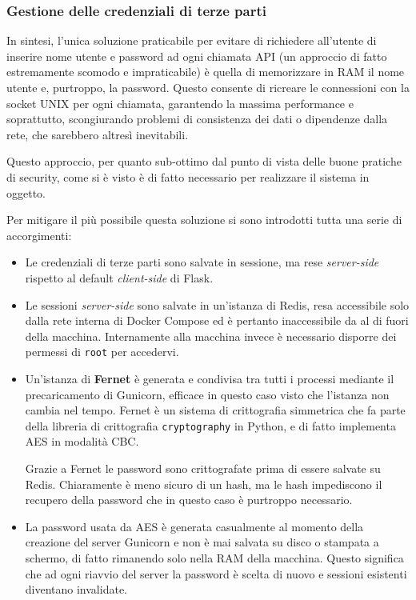 \subsubsection{Gestione delle credenziali di terze parti}
In sintesi, l'unica soluzione praticabile per evitare di richiedere all'utente di inserire nome utente e password ad ogni chiamata API (un approccio di fatto estremamente scomodo e impraticabile) è quella di memorizzare in RAM il nome utente e, purtroppo, la password. Questo consente di ricreare le connessioni con la socket UNIX per ogni chiamata, garantendo la massima performance e soprattutto, scongiurando problemi di consistenza dei dati o dipendenze dalla rete, che sarebbero altresì inevitabili.

Questo approccio, per quanto sub-ottimo dal punto di vista delle buone pratiche di security, come si è visto è di fatto necessario per realizzare il sistema in oggetto.

Per mitigare il più possibile questa soluzione si sono introdotti tutta una serie di accorgimenti:
\begin{itemize}
    \item Le credenziali di terze parti sono salvate in sessione, ma rese \emph{server-side} rispetto al default \emph{client-side} di Flask.
    \item Le sessioni \emph{server-side} sono salvate in un'istanza di Redis, resa accessibile solo dalla rete interna di Docker Compose ed è pertanto inaccessibile da al di fuori della macchina. Internamente alla macchina invece è necessario disporre dei permessi di \texttt{root} per accedervi.
    \item Un'istanza di \textbf{Fernet} è generata e condivisa tra tutti i processi mediante il precaricamento di Gunicorn, efficace in questo caso visto che l'istanza non cambia nel tempo. Fernet è un sistema di crittografia simmetrica che fa parte della libreria di crittografia \texttt{cryptography} in Python, e di fatto implementa AES in modalità CBC.
    
    Grazie a Fernet le password sono crittografate prima di essere salvate su Redis. Chiaramente è meno sicuro di un hash, ma le hash impediscono il recupero della password che in questo caso è purtroppo necessario.
    \item La password usata da AES è generata casualmente al momento della creazione del server Gunicorn e non è mai salvata su disco o stampata a schermo, di fatto rimanendo solo nella RAM della macchina. Questo significa che ad ogni riavvio del server la password è scelta di nuovo e sessioni esistenti diventano invalidate.
\end{itemize}

